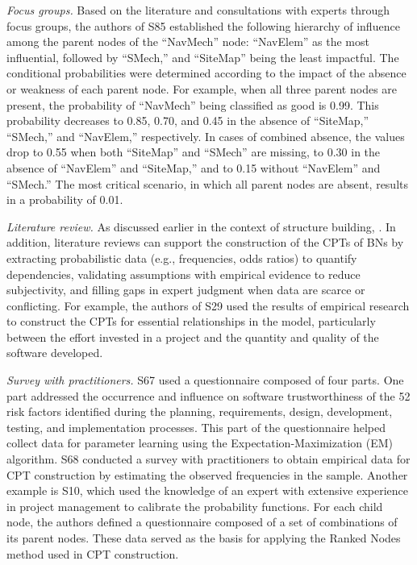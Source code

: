 \textit{Focus groups.} Based on the literature and consultations with experts through focus groups, the authors of S85 established the following hierarchy of influence among the parent nodes of the ``NavMech'' node: ``NavElem'' as the most influential, followed by ``SMech,'' and ``SiteMap'' being the least impactful. The conditional probabilities were determined according to the impact of the absence or weakness of each parent node. For example, when all three parent nodes are present, the probability of ``NavMech'' being classified as good is 0.99. This probability decreases to 0.85, 0.70, and 0.45 in the absence of ``SiteMap,'' ``SMech,'' and ``NavElem,'' respectively. In cases of combined absence, the values drop to 0.55 when both ``SiteMap'' and ``SMech'' are missing, to 0.30 in the absence of ``NavElem'' and ``SiteMap,'' and to 0.15 without ``NavElem'' and ``SMech.'' The most critical scenario, in which all parent nodes are absent, results in a probability of 0.01.

\textit{Literature review.} As discussed earlier in the context of structure building, . In addition, literature reviews can support the construction of the CPTs of BNs by extracting probabilistic data (e.g., frequencies, odds ratios) to quantify dependencies, validating assumptions with empirical evidence to reduce subjectivity, and filling gaps in expert judgment when data are scarce or conflicting. For example, the authors of S29 used the results of empirical research to construct the CPTs for essential relationships in the model, particularly between the effort invested in a project and the quantity and quality of the software developed.

\textit{Survey with practitioners.} S67 used a questionnaire composed of four parts. One part addressed the occurrence and influence on software trustworthiness of the 52 risk factors identified during the planning, requirements, design, development, testing, and implementation processes. This part of the questionnaire helped collect data for parameter learning using the Expectation-Maximization (EM) algorithm. S68 conducted a survey with practitioners to obtain empirical data for CPT construction by estimating the observed frequencies in the sample. Another example is S10, which used the knowledge of an expert with extensive experience in project management to calibrate the probability functions. For each child node, the authors defined a questionnaire composed of a set of combinations of its parent nodes. These data served as the basis for applying the Ranked Nodes method used in CPT construction.


